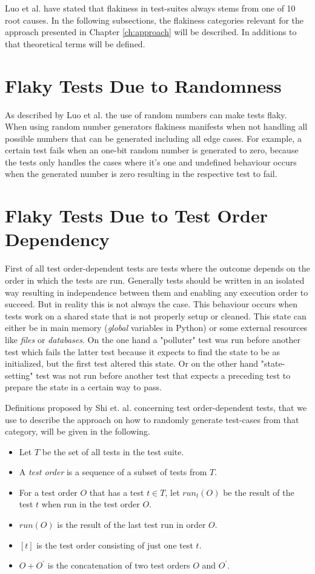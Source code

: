 \documentclass[
fancyheadings, %
%
%
]{stsreprt}
\begin{document}
Luo et al. \cite{luo:2014} have stated that flakiness in test-suites always stems from one of 10 root causes. 
In the following subsections, the flakiness categories relevant for the approach presented in Chapter \ref{ch:approach} will be described. 
In additions to that theoretical terms will be defined. 

\section{Flaky Tests Due to Randomness}
As described by Luo et al. \cite{luo:2014} the use of random numbers can make tests flaky. When using random number generators flakiness manifests when not handling all possible numbers that can be generated including all edge cases. For example, a certain test fails when an one-bit random number is generated to zero, because the tests only handles the cases where it's one and undefined behaviour occurs when the generated number is zero resulting in the respective test to fail. 

\section{Flaky Tests Due to Test Order Dependency}\label{sec:theory_order_dep}
First of all test order-dependent tests are tests where the outcome depends on the order in which the tests are run. 
Generally tests should be written in an isolated way resulting in independence between them and enabling any execution order to succeed. 
But in reality this is not always the case. This behaviour occurs when tests work on a shared state that is not properly setup or cleaned. 
This state can either be in main memory (\textit{global} variables in Python) or some external resources like \textit{files} or \textit{databases}. 
On the one hand a "polluter" test was run before another test which fails the latter test because it expects to find the state to be as initialized, but the first test altered this state. 
Or on the other hand "state-setting" test was not run before another test that expects a preceding test to prepare the state in a certain way to pass. \par 
Definitions proposed by Shi et. al. \cite{ifixflakies:2019} concerning test order-dependent tests, that we use to describe the approach on how to randomly generate test-cases from that category, will be given in the following. 


\begin{itemize}
\item Let $T$ be the set of all tests in the test suite.
\item A \textit{test order} is a sequence of a subset of tests from $T$.
\item For a test order $O$ that has a test $t \in T$, let $run_{t}(O)$ be the result of the test $t$ when run in the test order $O$.
\item $run(O)$ is the result of the last test run in order $O$.
\item $[t]$ is the test order consisting of just one test $t$.
\item $O + O^{'}$ is the concatenation of two test orders $O$ and $O^{'}$. 
\end{itemize}
\end{document}
